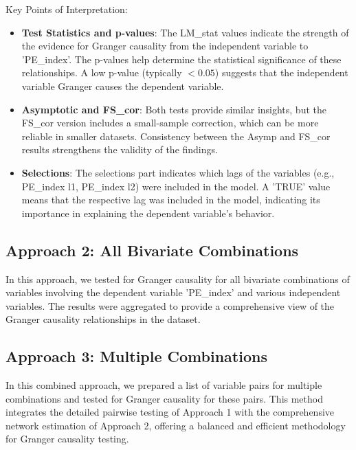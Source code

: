 \documentclass[11pt]{article}
\begin{document}
Key Points of Interpretation:
\begin{itemize}
    \item \textbf{Test Statistics and p-values}: The LM\_stat values indicate the strength of the evidence for Granger causality from the independent variable to 'PE\_index'. The p-values help determine the statistical significance of these relationships. A low p-value (typically $< 0.05$) suggests that the independent variable Granger causes the dependent variable.

    \item \textbf{Asymptotic and FS\_cor}: Both tests provide similar insights, but the FS\_cor version includes a small-sample correction, which can be more reliable in smaller datasets. Consistency between the Asymp and FS\_cor results strengthens the validity of the findings.
    \item \textbf{Selections}: The selections part indicates which lags of the variables (e.g., PE\_index l1, PE\_index l2) were included in the model. A 'TRUE' value means that the respective lag was included in the model, indicating its importance in explaining the dependent variable's behavior.
\end{itemize}

\subsection{Approach 2: All Bivariate Combinations}

In this approach, we tested for Granger causality for all bivariate combinations of variables involving the dependent variable 'PE\_index' and various independent variables. The results were aggregated to provide a comprehensive view of the Granger causality relationships in the dataset.

\subsection{Approach 3: Multiple Combinations}

In this combined approach, we prepared a list of variable pairs for multiple combinations and tested for Granger causality for these pairs. This method integrates the detailed pairwise testing of Approach 1 with the comprehensive network estimation of Approach 2, offering a balanced and efficient methodology for Granger causality testing.
\end{document}
